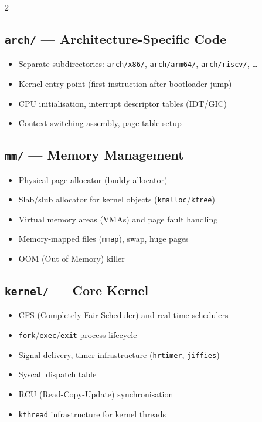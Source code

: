 2\documentclass[11pt,a4paper]{article}
\begin{document}
\subsection{\texttt{arch/} --- Architecture-Specific Code}
\begin{itemize}[noitemsep]
  \item Separate subdirectories: \texttt{arch/x86/}, \texttt{arch/arm64/}, \texttt{arch/riscv/}, \ldots
  \item Kernel entry point (first instruction after bootloader jump)
  \item CPU initialisation, interrupt descriptor tables (IDT/GIC)
  \item Context-switching assembly, page table setup
\end{itemize}

\subsection{\texttt{mm/} --- Memory Management}
\begin{itemize}[noitemsep]
  \item Physical page allocator (buddy allocator)
  \item Slab/slub allocator for kernel objects (\texttt{kmalloc}/\texttt{kfree})
  \item Virtual memory areas (VMAs) and page fault handling
  \item Memory-mapped files (\texttt{mmap}), swap, huge pages
  \item OOM (Out of Memory) killer
\end{itemize}

\subsection{\texttt{kernel/} --- Core Kernel}
\begin{itemize}[noitemsep]
  \item CFS (Completely Fair Scheduler) and real-time schedulers
  \item \texttt{fork}/\texttt{exec}/\texttt{exit} process lifecycle
  \item Signal delivery, timer infrastructure (\texttt{hrtimer}, \texttt{jiffies})
  \item Syscall dispatch table
  \item RCU (Read-Copy-Update) synchronisation
  \item \texttt{kthread} infrastructure for kernel threads
\end{itemize}
\end{document}
